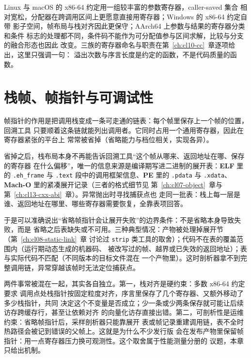 \documentclass[12pt,a4paper,fontset=fandol]{ctexbook}
\newcommand{\Sect}[1]{\texttt{.#1}}
\newcommand{\Sym}[1]{\texttt{#1}}
\newcommand{\Elf}{\textbf{\textsf{ELF}}}
\newcommand{\PeFmt}{\textbf{\textsf{PE}}}
\newcommand{\Macho}{\textbf{\textsf{Mach-O}}}
\newcommand{\Nix}{\textsf{Linux}}
\newcommand{\Win}{\textsf{Windows}}
\newcommand{\Mac}{\textsf{macOS}}
\newcommand{\xSixtyFour}{\textsf{x86-64}}
\newcommand{\ArmSixtyFour}{\textsf{AArch64}}
\begin{document}
\begin{abibox}[title={同一份代码在三族约定下的分配差异（定性）}]
\Nix{} 与 \Mac{} 的 \xSixtyFour{} 约定用一组较丰富的参数寄存器，caller-saved 集合
相对宽松，分配器在跨调用区间上更愿意直接用寄存器；\Win{} 的 \xSixtyFour{} 约定自带
影子空间，帧布局与栈对齐因此更保守；\ArmSixtyFour{} 上参数与结果的寄存器分类和条件
标志的处理都不同，条件码不能作为可分配值参与区间求解，比较与分支的融合形态也因此
改变。三族的寄存器命名与职责在第~\ref{ch:cl10-cc}~章逐项给出，这里只强调一句：
溢出次数与序言长度是约定的函数，不是代码质量的函数。
\end{abibox}

\section{栈帧、帧指针与可调试性}\label{sec:cl06-frame}

帧指针的作用是把调用栈变成一条可走通的链表：每个帧里保存上一个帧的位置，回溯工具
只要顺着这条链就能列出调用者。它同时占用一个通用寄存器，因此在寄存器紧张的平台上
常常被省掉（省略能力与档位相关，实现各异）。

省掉之后，栈布局本身不再能告诉回溯工具“这个帧从哪来、返回地址在哪、保存的寄存器
在什么偏移”，唯一的信息来源是编译期写进二进制的展开表：\Elf{} 里的
\Sect{eh\_frame} 与 \Sect{text} 段中的调用框架信息、\PeFmt{} 里的
\Sect{pdata} 与 \Sect{xdata}、\Macho{} 里的紧凑展开记录（三者的格式细节见
第~\ref{ch:cl07-object}~章与第~\ref{ch:cl13-cxx-abi}~章）。异常抛出时寻找捕获点也
走同一批表：栈上每一层是谁、返回地址在哪里、哪些寄存器需要恢复，全靠表项回答。

于是可以准确说出“省略帧指针会让展开失败”的边界条件：不是省略本身导致失败，而是
省略之后表缺失或不可用。三种典型情况：产物被处理掉展开节（第~\ref{ch:cl08-static-link}~章
讨论过 \Sym{strip} 类工具的取舍）；代码不在表的覆盖范围内（运行期动态生成的机器码、
被改写过的帧、越界或已失效的返回地址）；表与实际代码不匹配（不同版本的目标文件混在
一个产物里）。这时剖析器拿不到完整调用链，异常穿越该帧时无法定位捕获点。

\begin{warning}[title={帧指针、栈对齐与剖析的三角关系}]
两件事常被混在一起，其实各自独立。第一，栈对齐是硬约束：多数 \xSixtyFour{} 约定要求
调用点处栈指针按固定粒度对齐，序言里保存了几个寄存器、又额外移动了多少栈指针，共同
决定这个不变量是否成立；少一条或少两条保存就可能让后续访存跨缓存行，甚至让依赖对齐
的向量化访存直接出错。第二，可剖析性是运维约束：省略帧指针后，采样剖析器只能靠展开
表或帧记录重建调用链，表不全时热路径会被记到错误的父帧上。这就是为什么不少发行版
会在发布产物里保留帧指针：用一点寄存器压力换可观测性。这个取舍属于性能测量分册的
议题，本章只给出机制。
\end{warning}
\end{document}
